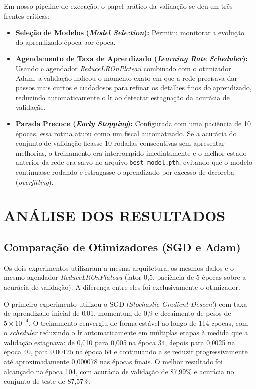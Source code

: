 \documentclass[12pt,a4paper]{article}
\begin{document}
Em nosso pipeline de execução, o papel prático da validação se deu em três frentes críticas:
\begin{itemize}
    \item \textbf{Seleção de Modelos (\textit{Model Selection}):} Permitiu monitorar a evolução do aprendizado época por época. 
    \item \textbf{Agendamento de Taxa de Aprendizado (\textit{Learning Rate Scheduler}):} Usando o agendador \textit{ReduceLROnPlateau} combinado com o otimizador Adam, a validação indicou o momento exato em que a rede precisava dar passos mais curtos e cuidadosos para refinar os detalhes finos do aprendizado, reduzindo automaticamente o lr ao detectar estagnação da acurácia de validação.
    \item \textbf{Parada Precoce (\textit{Early Stopping}):} Configurada com uma paciência de 10 épocas, essa rotina atuou como um fiscal automatizado. Se a acurácia do conjunto de validação ficasse 10 rodadas consecutivas sem apresentar melhorias, o treinamento era interrompido imediatamente e o melhor estado anterior da rede era salvo no arquivo \texttt{best\_model.pth}, evitando que o modelo continuasse rodando e estragasse o aprendizado por excesso de decoreba (\textit{overfitting}).
\end{itemize}

\newpage
\section{ANÁLISE DOS RESULTADOS}
\subsection{Comparação de Otimizadores (SGD e Adam)}

Os dois experimentos utilizaram a mesma arquitetura, os mesmos dados e o mesmo agendador \textit{ReduceLROnPlateau} (fator 0,5, paciência de 5 épocas sobre a acurácia de validação). A diferença entre eles foi exclusivamente o otimizador.

O primeiro experimento utilizou o SGD (\textit{Stochastic Gradient Descent}) com taxa de aprendizado inicial de 0,01, momentum de 0,9 e decaimento de pesos de $5 \times 10^{-4}$. O treinamento convergiu de forma estável ao longo de 114 épocas, com o \textit{scheduler} reduzindo o lr automaticamente em múltiplas etapas à medida que a validação estagnava: de 0,010 para 0,005 na época 34, depois para 0,0025 na época 40, para 0,00125 na época 64 e continuando a se reduzir progressivamente até aproximadamente 0,000078 nas épocas finais. O melhor resultado foi alcançado na época 104, com acurácia de validação de 87,99\% e acurácia no conjunto de teste de 87,57\%.
\end{document}
